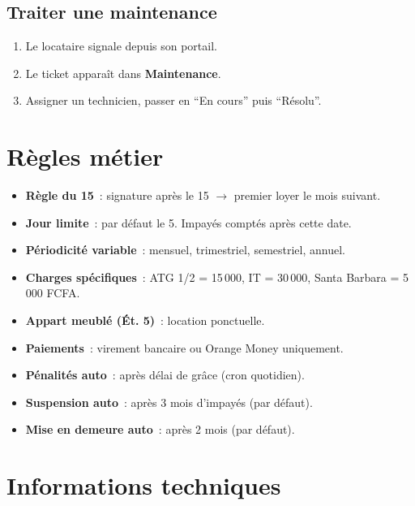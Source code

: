 \documentclass[12pt,a4paper]{article}
\begin{document}
\subsection{Traiter une maintenance}
\begin{enumerate}
\item Le locataire signale depuis son portail.
\item Le ticket appara\^it dans \textbf{Maintenance}.
\item Assigner un technicien, passer en ``En cours'' puis ``R\'esolu''.
\end{enumerate}

\newpage
\section{R\`egles m\'etier}

\begin{itemize}
\item \textbf{R\`egle du 15}~: signature apr\`es le 15 $\rightarrow$ premier loyer le mois suivant.
\item \textbf{Jour limite}~: par d\'efaut le 5. Impay\'es compt\'es apr\`es cette date.
\item \textbf{P\'eriodicit\'e variable}~: mensuel, trimestriel, semestriel, annuel.
\item \textbf{Charges sp\'ecifiques}~: ATG 1/2 = 15\,000, IT = 30\,000, Santa Barbara = 5\,000 FCFA.
\item \textbf{Appart meubl\'e (\'Et. 5)}~: location ponctuelle.
\item \textbf{Paiements}~: virement bancaire ou Orange Money uniquement.
\item \textbf{P\'enalit\'es auto}~: apr\`es d\'elai de gr\^ace (cron quotidien).
\item \textbf{Suspension auto}~: apr\`es 3 mois d'impay\'es (par d\'efaut).
\item \textbf{Mise en demeure auto}~: apr\`es 2 mois (par d\'efaut).
\end{itemize}

\section{Informations techniques}
\end{document}
